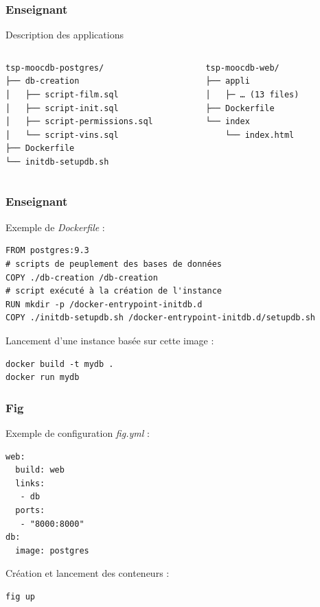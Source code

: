 \documentclass[10pt, compress]{beamer}
\begin{document}
\begin{frame}[fragile]
  \frametitle{Enseignant}
  
  Description des applications
  
  \begin{columns}[onlytextwidth]
    \begin{column}{0.5\textwidth}
      \begin{verbatim}
tsp-moocdb-postgres/
├── db-creation
│   ├── script-film.sql
│   ├── script-init.sql
│   ├── script-permissions.sql
│   └── script-vins.sql
├── Dockerfile
└── initdb-setupdb.sh
      \end{verbatim}
    \end{column}
    \begin{column}{0.5\textwidth}
      \begin{verbatim}
tsp-moocdb-web/
├── appli
│   ├─ … (13 files)
├── Dockerfile
└── index
    └── index.html
      \end{verbatim}
    \end{column}
​  \end{columns}
\end{frame}

\begin{frame}[fragile]
  \frametitle{Enseignant}

  Exemple de \emph{Dockerfile} :

  \begin{verbatim}
FROM postgres:9.3
# scripts de peuplement des bases de données
COPY ./db-creation /db-creation
# script exécuté à la création de l'instance
RUN mkdir -p /docker-entrypoint-initdb.d
COPY ./initdb-setupdb.sh /docker-entrypoint-initdb.d/setupdb.sh
  \end{verbatim}
  
  Lancement d'une instance basée sur cette image :
  
  \begin{verbatim}
docker build -t mydb .
docker run mydb
  \end{verbatim}
\end{frame}

  \begin{frame}[fragile]
  \frametitle{Fig}

  Exemple de configuration \emph{fig.yml} :

  \begin{verbatim}
web:
  build: web
  links:
   - db
  ports:
   - "8000:8000"
db:
  image: postgres
  \end{verbatim}
  
  Création et lancement des conteneurs :
  
    \begin{verbatim}
fig up
  \end{verbatim}
\end{frame}
\end{document}
